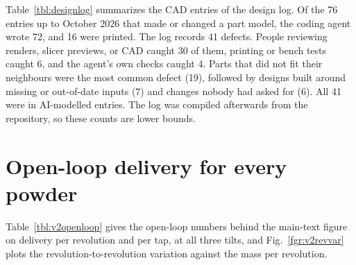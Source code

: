 \documentclass[10pt]{article}
\begin{document}
Table~\ref{tbl:designlog} summarizes the CAD entries of the design log. Of the
76 entries up to October 2026 that made or changed a part model, the coding agent wrote 72, and 16
were printed. The log records 41 defects. People reviewing renders, slicer
previews, or CAD caught 30 of them, printing or bench tests caught 6, and the
agent's own checks caught 4. Parts that did not fit their neighbours were the
most common defect (19), followed by designs built around missing or
out-of-date inputs (7) and changes nobody had asked for (6). All 41 were in
AI-modelled entries. The log was compiled afterwards from the repository, so
these counts are lower bounds.



\clearpage

\section{Open-loop delivery for every powder}
\label{sec:openloopall}

Table~\ref{tbl:v2openloop} gives the open-loop numbers behind the main-text
figure on delivery per revolution and per tap, at all three tilts, and
Fig.~\ref{fgr:v2revvar} plots the revolution-to-revolution variation against
the mass per revolution.
\end{document}
